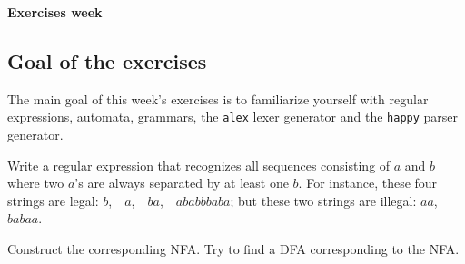 \documentclass[a4paper]{article}
\begin{document}
\begin{center}
{\Large\bf Exercises week }\\[1ex]
\end{center}

\subsection*{Goal of the exercises}

The main goal of this week's exercises is to familiarize yourself with
regular expressions, automata, grammars, the \texttt{alex} lexer
generator and the \texttt{happy} parser generator.





\begin{exercise}\label{exer-re}
  
  Write a regular expression that recognizes all sequences consisting
  of $a$ and $b$ where two $a$'s are always separated by at least one
  $b$.  For instance, these four strings are legal: $b$,\ \ $a$,\ \ 
  $ba$,\ \ $ababbbaba$; but these two strings are illegal: $aa$,\ \ 
  $babaa$.  

  
  Construct the corresponding NFA\@.  Try to find a DFA corresponding
  to the NFA. 
\end{exercise}
\end{document}
